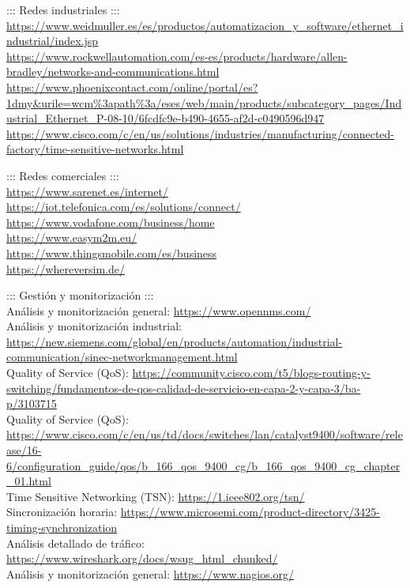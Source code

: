 \documentclass[spanish,12pt,a4paper,final,oneside]{book}
\begin{document}
::: Redes industriales :::
\\ \url{https://www.weidmuller.es/es/productos/automatizacion_y_software/ethernet_industrial/index.jsp}
\\ \url{https://www.rockwellautomation.com/es-es/products/hardware/allen-bradley/networks-and-communications.html}
\\ \url{https://www.phoenixcontact.com/online/portal/es?1dmy&urile=wcm%3apath%3a/eses/web/main/products/subcategory_pages/Industrial_Ethernet_P-08-10/6fcdfc9e-b490-4655-af2d-c0490596d947}
\\ \url{https://www.cisco.com/c/en/us/solutions/industries/manufacturing/connected-factory/time-sensitive-networks.html}

::: Redes comerciales :::
\\ \url{https://www.sarenet.es/internet/}
\\ \url{https://iot.telefonica.com/es/solutions/connect/}
\\ \url{https://www.vodafone.com/business/home}
\\ \url{https://www.easym2m.eu/}
\\ \url{https://www.thingsmobile.com/es/business}
\\ \url{https://whereversim.de/}

::: Gestión y monitorización :::
\\Análisis y monitorización general: \url{https://www.opennms.com/}
\\Análisis y monitorización industrial: \url{https://new.siemens.com/global/en/products/automation/industrial-communication/sinec-networkmanagement.html}
\\Quality of Service (QoS): \url{https://community.cisco.com/t5/blogs-routing-y-switching/fundamentos-de-qos-calidad-de-servicio-en-capa-2-y-capa-3/ba-p/3103715}
\\Quality of Service (QoS):  \url{https://www.cisco.com/c/en/us/td/docs/switches/lan/catalyst9400/software/release/16-6/configuration_guide/qos/b_166_qos_9400_cg/b_166_qos_9400_cg_chapter_01.html}
\\Time Sensitive Networking (TSN): \url{https://1.ieee802.org/tsn/}
\\Sincronización horaria: \url{https://www.microsemi.com/product-directory/3425-timing-synchronization}
\\Análisis detallado de tráfico: \url{https://www.wireshark.org/docs/wsug_html_chunked/}
\\Análisis y monitorización general: \url{https://www.nagios.org/}
\end{document}
